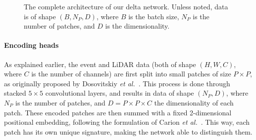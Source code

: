 \begin{figure}
{
    \shorthandon{:!}
  }

  \caption{The complete architecture of our \acrshort{delta} network. Unless noted, data is of shape \((B, N_P, D)\), where \(B\) is the batch size, \(N_P\) is the number of patches, and \(D\) is the dimensionality.}\label{fig:delta:network}
\end{figure}

\paragraph{Encoding heads}
As explained earlier, the event and LiDAR data (both of shape \((H, W, C)\), where \(C\) is the number of channels) are first split into small patches of size \(P\times{}P\), as originally proposed by Dosovitskiy \textit{et al.}~\cite{Dosovitskiy2020AnII}. This process is done through stacked \(5\times{}5\) convolutional layers, and results in data of shape \((N_P, D)\), where \(N_P\) is the number of patches, and \(D = P\times{}P\times{}C\) the dimensionality of each patch. These encoded patches are then summed with a fixed 2-dimensional positional embedding, following the formulation of Carion \textit{et al.}~\cite{Carion2020EndtoEndOD}. This way, each patch has its own unique signature, making the network able to distinguish them.

